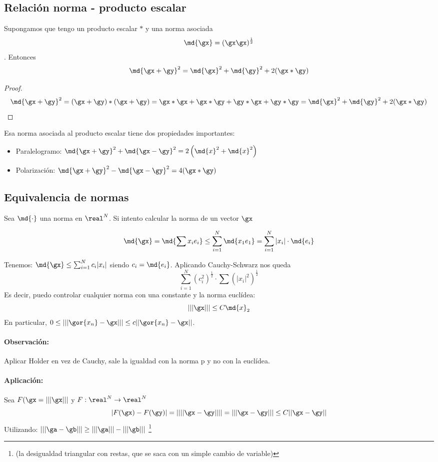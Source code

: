 \documentclass[a4paper,10pt]{apuntes}
\begin{document}
\subsection{Relación norma - producto escalar}
\begin{theorem}
Supongamos que tengo un producto escalar $\ast$ y una norma asociada \[ \md{\gx} = (\gx \gx) ^ {\frac{1}{2}}\]. Entonces \[ \md{\gx + \gy}^ 2 =  \md{\gx} ^ 2 + \md{\gy} ^ 2+2(\gx\ast\gy) \]
\end{theorem}

\begin{proof}
\[ \md{\gx+\gy}^2 = (\gx+\gy)\ast(\gx+\gy) = \gx \ast \gx + \gx \ast \gy + \gy \ast \gx + \gy \ast \gy=\md{\gx} ^ 2 + \md{\gy} ^ 2+2(\gx\ast\gy) \]
\end{proof}

Esa norma asociada al producto escalar tiene dos propiedades importantes:
\begin{itemize}
\item Paralelogramo: $\md{\gx+\gy}^ 2 + \md{\gx-\gy} ^ 2 = 2\left(\md{x}^2+\md{x}^2\right) $
\item Polarización: $\md{\gx+\gy} ^ 2 - \md{\gx-\gy} ^ 2 = 4(\gx*\gy)$
\end{itemize}


\subsection{Equivalencia de normas}
Sea $\md{\cdot}$ una norma en $\real^N$. Si intento calcular la norma de un vector $\gx$

\[ \md{\gx} = \md{\sum x_i e_i} \leq \sum_{i=1}^N \md{x_1 e_1} = \sum_{i=1}^N|x_i|\cdot\md{e_i} \]

Tenemos: $\md{\gx} \leq \sum_{i=1}^N c_i |x_i|$ siendo $c_i = \md{e_i}$. Aplicando Cauchy-Schwarz  nos queda
\[ \sum_{i=1}^N \left(c_i^2\right)^\frac{1}{2} \cdot \sum \left(|x_i|^2\right)^\frac{1}{2} \]
Es decir, puedo controlar cualquier norma con una constante y la norma euclídea:
$$|||\gx||| \leq C \md{x}_{2}$$
En particular, $0 \leq |||\gor{x_n} - \gx|||\leq c ||\gor{x_n}-\gx||$. 
\paragraph{Observación:} Aplicar Holder en vez de Cauchy, sale la igualdad con la norma p y no con la euclídea.
\paragraph{Aplicación:}
Sea $F(\gx = |||\gx|||$ y $F:\real^N \rightarrow \real^N$ 
$$|F(\gx)-F(\gy)| = \left| |||\gx - \gy||| \right| = |||\gx - \gy||| \leq C ||\gx - \gy||$$
Utilizando: $|||\ga-\gb||| \ge |||\ga||| - |||\gb|||$ \footnote{(la desigualdad triangular con restas, que se saca con un simple cambio de variable)}
\end{document}
